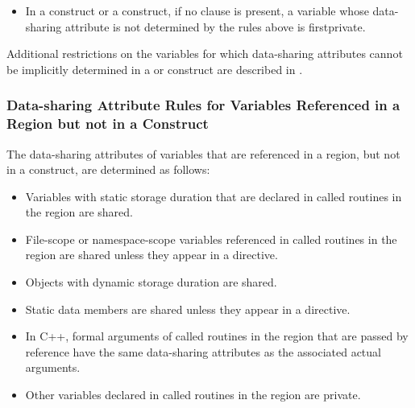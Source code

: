 \begin{itemize}
\item In a  construct or a  construct, if no 
 clause is present, a variable whose data-sharing 
attribute is not determined by the rules above is firstprivate.
\end{itemize}

Additional restrictions on the variables for which data-sharing attributes cannot be 
implicitly determined in a  or  construct are described in 
.









\subsubsection{Data-sharing Attribute Rules for Variables Referenced in a Region but not in a Construct}
\label{subsubsec:Data-sharing Attribute Rules for Variables Referenced in a Region but not in a Construct}
The data-sharing attributes of variables that are referenced in a region, but not in a 
construct, are determined as follows: 

\ccppspecificstart
\begin{itemize}
\item Variables with static storage duration that are declared in called routines in the region 
are shared.

\item File-scope or namespace-scope variables referenced in called routines in the region 
are shared unless they appear in a  directive.

\item Objects with dynamic storage duration are shared.

\item Static data members are shared unless they appear in a  directive.

\item In C++, formal arguments of called routines in the region that are passed by reference have the same data-sharing attributes as the associated actual arguments. 

\item Other variables declared in called routines in the region are private.
\end{itemize}
\ccppspecificend

